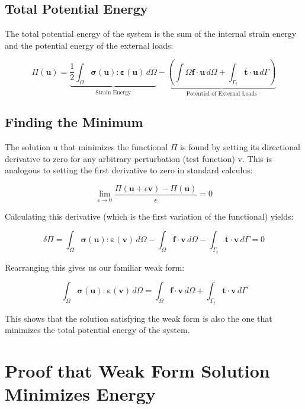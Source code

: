 \documentclass[
  11pt,
  a4paper,
]{scrbook}
\begin{document}
\subsection{Total Potential Energy}\label{total-potential-energy}

The total potential energy of the system is the sum of the internal
strain energy and the potential energy of the external loads:

\[\Pi(\mathbf{u}) = \underbrace{\frac{1}{2} \int_{\Omega} \boldsymbol{\sigma}(\mathbf{u}) : \boldsymbol{\varepsilon}(\mathbf{u}) \, d\Omega}_{\text{Strain Energy}} - \underbrace{\left( \int{\Omega} \mathbf{f} \cdot \mathbf{u} \, d\Omega + \int_{\Gamma_t} \bar{\mathbf{t}} \cdot \mathbf{u} \, d\Gamma \right)}_{\text{Potential of External Loads}}\]

\subsection{Finding the Minimum}\label{finding-the-minimum}

The solution u that minimizes the functional \(\Pi\) is found by setting
its directional derivative to zero for any arbitrary perturbation (test
function) v. This is analogous to setting the first derivative to zero
in standard calculus:

\[\lim_{\epsilon \to 0} \frac{\Pi(\mathbf{u} + \epsilon\mathbf{v}) - \Pi(\mathbf{u})}{\epsilon} = 0\]

Calculating this derivative (which is the first variation of the
functional) yields:

\[\delta\Pi = \int_{\Omega} \boldsymbol{\sigma}(\mathbf{u}) : \boldsymbol{\varepsilon}(\mathbf{v}) \, d\Omega - \int_{\Omega} \mathbf{f} \cdot \mathbf{v} \, d\Omega - \int_{\Gamma_t} \bar{\mathbf{t}} \cdot \mathbf{v} \, d\Gamma = 0\]

Rearranging this gives us our familiar weak form:

\[\int_{\Omega} \boldsymbol{\sigma}(\mathbf{u}) : \boldsymbol{\varepsilon}(\mathbf{v}) \, d\Omega = \int_{\Omega} \mathbf{f} \cdot \mathbf{v} \, d\Omega + \int_{\Gamma_t} \bar{\mathbf{t}} \cdot \mathbf{v} \, d\Gamma\]

This shows that the solution satisfying the weak form is also the one
that minimizes the total potential energy of the system.

\section{Proof that Weak Form Solution Minimizes
Energy}\label{proof-that-weak-form-solution-minimizes-energy}
\end{document}
